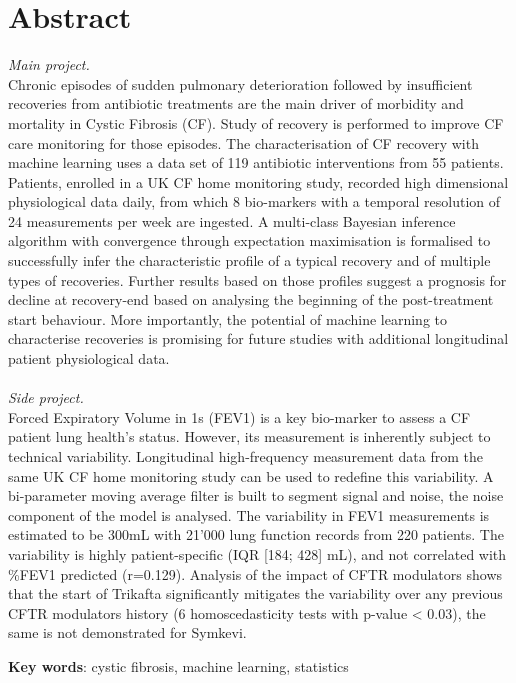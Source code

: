 


\chapter*{Abstract}

\textit{Main project.}\\
Chronic episodes of sudden pulmonary deterioration followed by insufficient recoveries from antibiotic treatments are the main driver of morbidity and mortality in Cystic Fibrosis (CF). Study of recovery is performed to improve CF care monitoring for those episodes. The characterisation of CF recovery with machine learning uses a data set of 119 antibiotic interventions from 55 patients. Patients, enrolled in a UK CF home monitoring study, recorded high dimensional physiological data daily, from which 8 bio-markers with a temporal resolution of 24 measurements per week are ingested. A multi-class Bayesian inference algorithm with convergence through expectation maximisation is formalised to successfully infer the characteristic profile of a typical recovery and of multiple types of recoveries. Further results based on those profiles suggest a prognosis for decline at recovery-end based on analysing the beginning of the post-treatment start behaviour. More importantly, the potential of machine learning to characterise recoveries is promising for future studies with additional longitudinal patient physiological data.\\\\
\textit{Side project.}\\
Forced Expiratory Volume in 1s (FEV1) is a key bio-marker to assess a CF patient lung health's status. However, its measurement is inherently subject to technical variability. Longitudinal high-frequency measurement data from the same UK CF home monitoring study can be used to redefine this variability. A bi-parameter moving average filter is built to segment signal and noise, the noise component of the model is analysed. The variability in FEV1 measurements is estimated to be 300mL with 21'000 lung function records from 220 patients. The variability is highly patient-specific (IQR [184; 428] mL), and not correlated with \%FEV1 predicted (r=0.129). Analysis of the impact of CFTR modulators shows that the start of Trikafta significantly mitigates the variability over any previous CFTR modulators history (6 homoscedasticity tests with p-value < 0.03), the same is not demonstrated for Symkevi.

\vskip0.5cm
\textbf{Key words}: cystic fibrosis, machine learning, statistics


% 